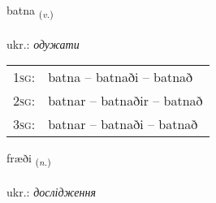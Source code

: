 \documentclass[frontgrid, backgrid]{flacards}\usepackage[]{graphicx}\usepackage[]{xcolor}
\begin{document}
\renewcommand{\blhead}{\vskip5pt {\small\bfseries\footnotesize Sagnorð | дієслово }}
\renewcommand{\bcfoot}{\vskip5pt \hspace{2pt}{\small\bfseries\footnotesize 3K}}


{batna \small{\textsubscript{(\textit{v.})}} \\[1ex] %
\textphonetic{[pahtna]} \\
ukr.: \emph{одужати} \\  [2ex]
\renewcommand*{\arraystretch}{0.8}
\begin{tabular}{p{1cm}l}
\textsc{1sg}: & batna -- batnaði -- batnað \\ 
\textsc{2sg}: & batnar -- batnaðir -- batnað \\ 
\textsc{3sg}: & batnar -- batnaði -- batnað \\ 
\end{tabular}
}

\renewcommand{\flhead}{\vskip5pt \fboxsep=0pt {\small\bfseries\footnotesize Nafnorð | іменник}}
\renewcommand{\fcfoot}{\vskip5pt \fboxsep=0pt \hspace{2pt}{\small\bfseries\footnotesize 3K}}

\renewcommand{\blhead}{\vskip5pt {\small\bfseries\footnotesize Nafnorð | іменник }}
\renewcommand{\bcfoot}{\vskip5pt \hspace{2pt}{\small\bfseries\footnotesize 3K}}


{fræði \small{\textsubscript{(\textit{n.})}} \\[1ex] %
\textphonetic{[fraiːðɪ]} \\
ukr.: \emph{дослідження} \\  [2ex]
\renewcommand*{\arraystretch}{0.8}
}

\renewcommand{\flhead}{\vskip5pt \fboxsep=0pt {\small\bfseries\footnotesize Lýsingarorð | прикметник}}
\renewcommand{\fcfoot}{\vskip5pt \fboxsep=0pt \hspace{2pt}{\small\bfseries\footnotesize 3K}}
\end{document}
